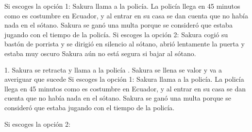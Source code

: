 \documentclass[12pt]{report}
\begin{document}
Si escoges la opción 1:
\newline
\newline
Sakura llama a la policía. La policía llega en 45 minutos como es costumbre en Ecuador, y al entrar en su casa se dan cuenta que no había nada en el sótano. Sakura se ganó una multa porque se consideró que estaba jugando con el tiempo de la policía.
\newline
\newline
Si escoges la opción 2:
\newline
\newline
Sakura cogió su bastón de porrista y se dirigió en silencio al sótano, abrió lentamente la puerta y estaba muy oscuro
\newline
\newline
Sakura aún no está segura si bajar al sótano.
\newline
\newline

1.	Sakura se retracta y llama a la policía
\newline
{}.	Sakura se llena se valor y va a averiguar que sucede
\newline
Si escoges la opción 1:
\newline
\newline
Sakura llama a la policía. La policía llega en 45 minutos como es costumbre en Ecuador, y al entrar en su casa se dan cuenta que no había nada en el sótano. Sakura se ganó una multa porque se consideró que estaba jugando con el tiempo de la policía.
\newline
\newline

Si escoges la opción 2:
\newline
\newline
\end{document}
